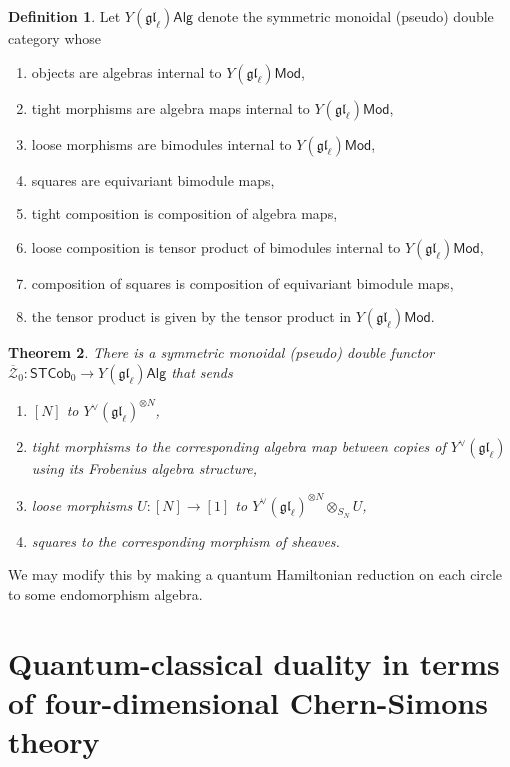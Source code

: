 \documentclass[11pt]{report}
\newtheorem{theorem}{Theorem}[section]
\theoremstyle{definition}
\newtheorem{definition}[theorem]{Definition}
\theoremstyle{remark}
\theoremstyle{remark}
\begin{document}
\begin{definition}
Let $Y(\mathfrak{gl}_\ell)\mathsf{Alg}$ denote the symmetric monoidal (pseudo) double category whose
\begin{enumerate}[label=(\roman*)]
\item objects are algebras internal to $Y(\mathfrak{gl}_\ell)\mathsf{Mod}$,
\item tight morphisms are algebra maps internal to $Y(\mathfrak{gl}_\ell)\mathsf{Mod}$,
\item loose morphisms are bimodules internal to $Y(\mathfrak{gl}_\ell)\mathsf{Mod}$,
\item squares are equivariant bimodule maps,
\item tight composition is composition of algebra maps,
\item loose composition is tensor product of bimodules internal to $Y(\mathfrak{gl}_\ell)\mathsf{Mod}$,
\item composition of squares is composition of equivariant bimodule maps,
\item the tensor product is given by the tensor product in $Y(\mathfrak{gl}_\ell)\mathsf{Mod}$.
\end{enumerate}
\end{definition}

\begin{theorem}
There is a symmetric monoidal (pseudo) double functor $\overline{\mathcal{Z}}_0: \mathsf{STCob}_0 \to Y(\mathfrak{gl}_\ell)\mathsf{Alg}$ that sends
\begin{enumerate}[label=(\roman*)]
\item $[N]$ to $Y^\vee(\mathfrak{gl}_\ell)^{\otimes N}$,
\item tight morphisms to the corresponding algebra map between copies of $Y^\vee(\mathfrak{gl}_\ell)$ using its Frobenius algebra structure,
\item loose morphisms $U: [N] \to [1]$ to $Y^\vee(\mathfrak{gl}_\ell)^{\otimes N} \otimes_{S_N} U$,
\item squares to the corresponding morphism of sheaves.
\end{enumerate}
\end{theorem}

We may modify this by making a quantum Hamiltonian reduction on each circle to some endomorphism algebra.

\section{Quantum-classical duality in terms of four-dimensional Chern-Simons theory}
\end{document}
